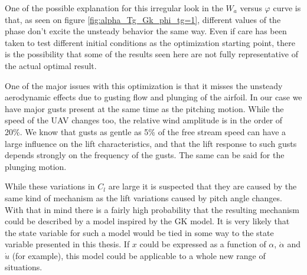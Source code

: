 \par One of the possible explanation for this irregular look in the $W_a$ versus $\varphi$ curve is that, as seen on figure \ref{fig:alpha_Tg_Gk_phi_tg=1}, different values of the phase don't excite the unsteady behavior the same way.
Even if care has been taken to test different initial conditions as the optimization starting point, there is the possibility that some of the results seen here are not fully representative of the actual optimal result.

\FloatBarrier
{}

One of the major issues with this optimization is that it misses the unsteady aerodynamic effects due to gusting flow and plunging of the airfoil.
In our case we have major gusts present at the same time as the pitching motion.
While the speed of the UAV changes too, the relative wind amplitude is in the order of 20\%.
We know that gusts as gentle as 5\% of the free stream speed can have a large influence on the lift characteristics, and that the lift response to such gusts depends strongly on the frequency of the gusts.
The same can be said for the plunging motion.

\par While these variations in $C_l$ are large it is suspected that they are caused by the same kind of mechanism as the lift variations caused by pitch angle changes.
With that in mind there is a fairly high probability that the resulting mechanism could be described by a model inspired by the GK model.
It is very likely that the state variable for such a model would be tied in some way to the state variable presented in this thesis.
If $x$ could be expressed as a function of $\alpha$, $\dot{\alpha}$ and $\dot{u}$ (for example), this model could be applicable to a whole new range of situations.

